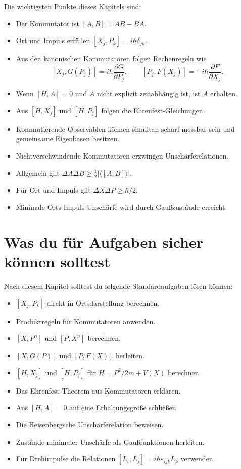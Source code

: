 \begin{conceptbox}
Die wichtigsten Punkte dieses Kapitels sind:
\begin{itemize}
    \item Der Kommutator ist $[A,B]=AB-BA$.
    \item Ort und Impuls erfüllen $[X_j,P_k]=i\hbar\delta_{jk}$.
    \item Aus den kanonischen Kommutatoren folgen Rechenregeln wie
    \[
        [X_j,G(P_j)]=i\hbar\frac{\partial G}{\partial P_j},
        \qquad
        [P_j,F(X_j)]=-i\hbar\frac{\partial F}{\partial X_j}.
    \]
    \item Wenn $[H,A]=0$ und $A$ nicht explizit zeitabhängig ist, ist $A$ erhalten.
    \item Aus $[H,X_j]$ und $[H,P_j]$ folgen die Ehrenfest-Gleichungen.
    \item Kommutierende Observablen können simultan scharf messbar sein und gemeinsame Eigenbasen besitzen.
    \item Nichtverschwindende Kommutatoren erzwingen Unschärferelationen.
    \item Allgemein gilt $\Delta A\Delta B\ge\frac12|\langle[A,B]\rangle|$.
    \item Für Ort und Impuls gilt $\Delta X\Delta P\ge\hbar/2$.
    \item Minimale Orts-Impuls-Unschärfe wird durch Gaußzustände erreicht.
\end{itemize}
\end{conceptbox}

\section{Was du für Aufgaben sicher können solltest}

Nach diesem Kapitel solltest du folgende Standardaufgaben lösen können:
\begin{itemize}
    \item $[X_j,P_k]$ direkt in Ortsdarstellung berechnen.
    \item Produktregeln für Kommutatoren anwenden.
    \item $[X,P^n]$ und $[P,X^n]$ berechnen.
    \item $[X,G(P)]$ und $[P,F(X)]$ herleiten.
    \item $[H,X_j]$ und $[H,P_j]$ für $H=P^2/2m+V(X)$ berechnen.
    \item Das Ehrenfest-Theorem aus Kommutatoren erklären.
    \item Aus $[H,A]=0$ auf eine Erhaltungsgröße schließen.
    \item Die Heisenbergsche Unschärferelation beweisen.
    \item Zustände minimaler Unschärfe als Gaußfunktionen herleiten.
    \item Für Drehimpulse die Relationen $[L_i,L_j]=i\hbar\varepsilon_{ijk}L_k$ verwenden.
\end{itemize}
